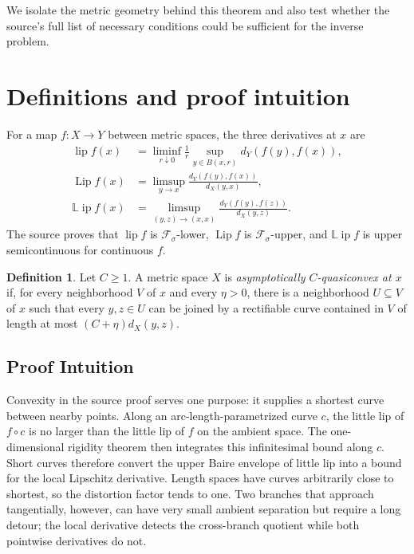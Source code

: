 \documentclass[11pt]{article}
\theoremstyle{definition}
\newtheorem{definition}[theorem]{Definition}
\newcommand{\lipf}{\operatorname{lip}}
\newcommand{\Lipf}{\operatorname{Lip}}
\newcommand{\LLip}{\mathbb L\!\operatorname{ip}}
\begin{document}
We isolate the metric geometry behind this theorem and also test whether the
source's full list of necessary conditions could be sufficient for the
inverse problem.

\section{Definitions and proof intuition}

For a map $f:X\to Y$ between metric spaces, the three derivatives at $x$ are
\begin{align*}
 \lipf f(x)&=\liminf_{r\downarrow0}\frac1r
   \sup_{y\in B(x,r)}d_Y(f(y),f(x)),\\
 \Lipf f(x)&=\limsup_{y\to x}\frac{d_Y(f(y),f(x))}{d_X(y,x)},\\
 \LLip f(x)&=\limsup_{(y,z)\to(x,x)}
   \frac{d_Y(f(y),f(z))}{d_X(y,z)}.
\end{align*}
The source proves that $\lipf f$ is $\mathcal F_\sigma$-lower,
$\Lipf f$ is $\mathcal F_\sigma$-upper, and $\LLip f$ is upper
semicontinuous for continuous $f$.

\begin{definition}
Let $C\geq1$.  A metric space $X$ is \emph{asymptotically
$C$-quasiconvex at $x$} if, for every neighborhood $V$ of $x$ and every
$\eta>0$, there is a neighborhood $U\subseteq V$ of $x$ such that every
$y,z\in U$ can be joined by a rectifiable curve contained in $V$ of length
at most $(C+\eta)d_X(y,z)$.
\end{definition}

\subsection*{Proof Intuition}

Convexity in the source proof serves one purpose: it supplies a shortest
curve between nearby points.  Along an arc-length-parametrized curve $c$,
the little lip of $f\circ c$ is no larger than the little lip of $f$ on the
ambient space.  The one-dimensional rigidity theorem then integrates this
infinitesimal bound along $c$.  Short curves therefore convert the upper
Baire envelope of little lip into a bound for the local Lipschitz derivative.
Length spaces have curves arbitrarily close to shortest, so the distortion
factor tends to one.  Two branches that approach tangentially, however, can
have very small ambient separation but require a long detour; the local
derivative detects the cross-branch quotient while both pointwise derivatives
do not.
\end{document}
